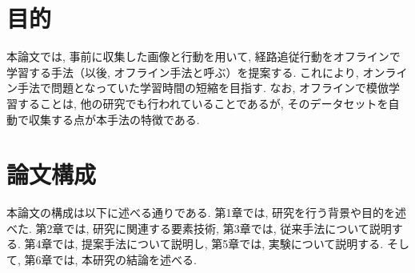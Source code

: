 \newpage
\section{目的}
本論文では, 事前に収集した画像と行動を用いて, 経路追従行動をオフラインで学習する手法（以後, オフライン手法と呼ぶ）を提案する. これにより, オンライン手法で問題となっていた学習時間の短縮を目指す. なお, オフラインで模倣学習することは, 他の研究でも行われていることであるが, そのデータセットを自動で収集する点が本手法の特徴である. 
\section{論文構成}
本論文の構成は以下に述べる通りである. 第1章では, 研究を行う背景や目的を述べた. 第2章では, 研究に関連する要素技術, 第3章では, 従来手法について説明する. 第4章では, 提案手法について説明し, 第5章では, 実験について説明する. そして, 第6章では, 本研究の結論を述べる. 
     
